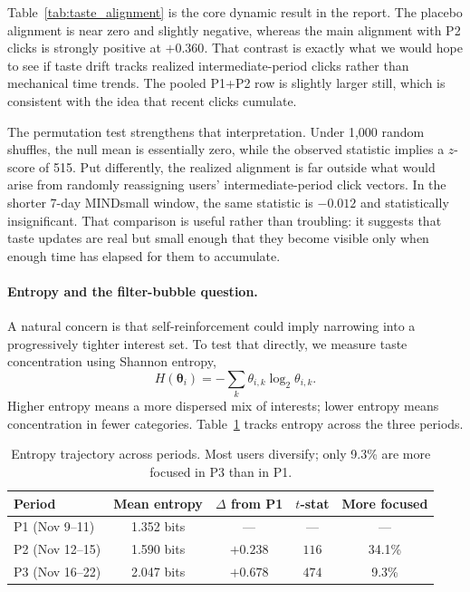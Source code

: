\documentclass[11pt]{article}
\begin{document}
Table~\ref{tab:taste_alignment} is the core dynamic result in the report. The placebo alignment is near zero and slightly negative, whereas the main alignment with P2 clicks is strongly positive at $+0.360$. That contrast is exactly what we would hope to see if taste drift tracks realized intermediate-period clicks rather than mechanical time trends. The pooled P1+P2 row is slightly larger still, which is consistent with the idea that recent clicks cumulate.

The permutation test strengthens that interpretation. Under 1,000 random shuffles, the null mean is essentially zero, while the observed statistic implies a $z$-score of 515. Put differently, the realized alignment is far outside what would arise from randomly reassigning users' intermediate-period click vectors. In the shorter 7-day MINDsmall window, the same statistic is $-0.012$ and statistically insignificant. That comparison is useful rather than troubling: it suggests that taste updates are real but small enough that they become visible only when enough time has elapsed for them to accumulate.

\paragraph{Entropy and the filter-bubble question.}
A natural concern is that self-reinforcement could imply narrowing into a progressively tighter interest set. To test that directly, we measure taste concentration using Shannon entropy,
\[
H(\boldsymbol{\theta}_i) = -\sum_k \theta_{i,k}\log_2 \theta_{i,k}.
\]
Higher entropy means a more dispersed mix of interests; lower entropy means concentration in fewer categories. Table~\ref{tab:entropy} tracks entropy across the three periods.

\begin{table}[ht]
\centering
\caption{Entropy trajectory across periods. Most users diversify; only 9.3\% are more focused in P3 than in P1.}
\label{tab:entropy}
\begin{tabular}{lcccc}
\toprule
Period & Mean entropy & $\Delta$ from P1 & $t$-stat & More focused \\
\midrule
P1 (Nov 9--11) & 1.352 bits & --- & --- & --- \\
P2 (Nov 12--15) & 1.590 bits & $+0.238$ & $116$ & 34.1\% \\
P3 (Nov 16--22) & 2.047 bits & $+0.678$ & $474$ & 9.3\% \\
\bottomrule
\end{tabular}
\end{table}
\FloatBarrier
\end{document}
